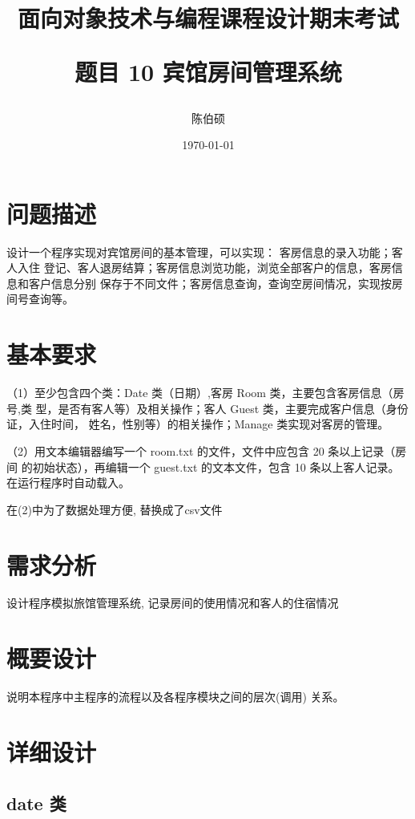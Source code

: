 \documentclass[UTF8]{ctexart}
\title{面向对象技术与编程课程设计期末考试 \\ [2ex] \begin{large} 题目 10 宾馆房间管理系统 \end{large} }
\author{陈伯硕}
\date{\today}
\begin{document}
\maketitle
\tableofcontents

\section{问题描述}
设计一个程序实现对宾馆房间的基本管理，可以实现：
客房信息的录入功能；客人入住
登记、客人退房结算；客房信息浏览功能，浏览全部客户的信息，客房信息和客户信息分别
保存于不同文件；客房信息查询，查询空房间情况，实现按房间号查询等。

\section{基本要求}
（1）至少包含四个类：Date 类（日期）,客房 Room 类，主要包含客房信息（房号,类
型，是否有客人等）及相关操作；客人 Guest 类，主要完成客户信息（身份证，入住时间，
姓名，性别等）的相关操作；Manage 类实现对客房的管理。

（2）用文本编辑器编写一个 room.txt 的文件，文件中应包含 20 条以上记录（房间
的初始状态），再编辑一个 guest.txt 的文本文件，包含 10 条以上客人记录。在运行程序时自动载入。

在(2)中为了数据处理方便, 替换成了csv文件
\section{需求分析}
设计程序模拟旅馆管理系统, 记录房间的使用情况和客人的住宿情况
\section{概要设计}
说明本程序中主程序的流程以及各程序模块之间的层次(调用) 关系。
\section{详细设计}

\subsection{date 类}
\end{document}
